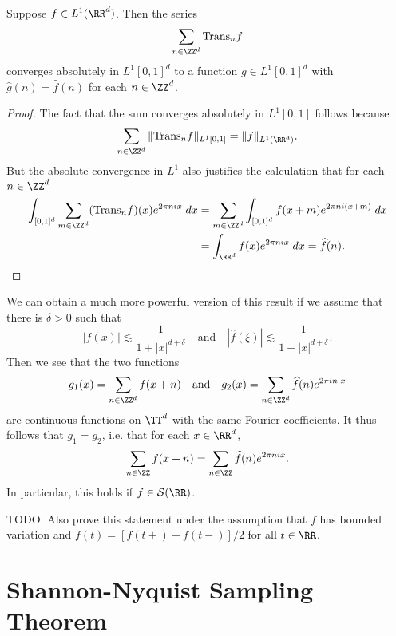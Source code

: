 \begin{theorem}
    Suppose $f \in L^1(\RR^d)$. Then the series
    \[ \sum_{n \in \ZZ^d} \text{Trans}_n f \]
    converges absolutely in $L^1[0,1]^d$ to a function $g \in L^1[0,1]^d$ with $\widehat{g}(n) = \widehat{f}(n)$ for each $n \in \ZZ^d$.
\end{theorem}
\begin{proof}
    The fact that the sum converges absolutely in $L^1[0,1]$ follows because
    \[ \sum_{n \in \ZZ^d} \| \text{Trans}_n f \|_{L^1[0,1]} = \| f \|_{L^1(\RR^d)}. \]
    But the absolute convergence in $L^1$ also justifies the calculation that for each $n \in \ZZ^d$
    \begin{align*}
        \int_{[0,1]^d} \sum_{m \in \ZZ^d} (\text{Trans}_n f)(x) e^{2 \pi nix}\; dx &= \sum_{m \in \ZZ^d} \int_{[0,1]^d} f(x + m) e^{2 \pi n i (x + m)}\; dx\\
        &= \int_{\RR^d} f(x) e^{2 \pi n i x}\; dx = \widehat{f}(n). \qedhere
    \end{align*}
\end{proof}

We can obtain a much more powerful version of this result if we assume that there is $\delta > 0$ such that
%
\[ |f(x)| \lesssim \frac{1}{1 + |x|^{d + \delta}} \quad\text{and}\quad |\widehat{f}(\xi)| \lesssim \frac{1}{1 + |x|^{d + \delta}}. \]
%
Then we see that the two functions
%
\[ g_1(x) = \sum_{n \in \ZZ^d} f(x + n) \quad\text{and}\quad g_2(x) = \sum_{n \in \ZZ^d} \widehat{f}(n) e^{2 \pi i n \cdot x} \]
%
are continuous functions on $\TT^d$ with the same Fourier coefficients. It thus follows that $g_1 = g_2$, i.e. that for each $x \in \RR^d$,
%
\[ \sum_{n \in \ZZ} f(x + n) = \sum_{n \in \ZZ} \widehat{f}(n) e^{2 \pi n i x}. \]
%
In particular, this holds if $f \in \mathcal{S}(\RR)$.

TODO: Also prove this statement under the assumption that $f$ has bounded variation and $f(t) = [f(t+) + f(t-)]/2$ for all $t \in \RR$.  

\section{Shannon-Nyquist Sampling Theorem}

